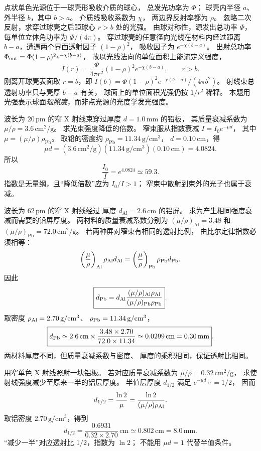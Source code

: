 点状单色光源位于一球壳形吸收介质的球心，
总发光功率为 $\Phi$；
球壳内半径 $a$、外半径 $b$，其中 $b>a$。
介质线吸收系数为 $\chi$，
两边界反射率都为 $\rho$。
忽略二次反射，求穿过球壳之后距球心 $r>b$
处的光强。
\exsolution
由球对称性，源发出总功率 $\Phi$，
每单位立体角功率为 $\Phi/(4\pi)$。
穿过球壳的任意径向光线在材料内经过距离
$b-a$，遭遇两个界面透射因子 $(1-\rho)^2$，
吸收因子为 $e^{-\chi(b-a)}$。
出射总功率
$\Phi_{\rm out}=\Phi(1-\rho)^2e^{-\chi(b-a)}$，
故以光线法向的单位面积上能流定义强度，
\[
 \boxed{I(r)=\frac{\Phi}{4\pi r^2}
 (1-\rho)^2e^{-\chi(b-a)}},\qquad r>b.
\]
刚离开球壳表面取 $r=b$，即
$\boxed{I(b)=\Phi(1-\rho)^2e^{-\chi(b-a)}/(4\pi b^2)}$。
\excheck 射线束总透射功率只与壳厚 $b-a$ 有关，
球面上的单位面积光强仍按 $1/r^2$ 稀释。
本题用光强表示球面\emph{辐照度}，而非点光源的光度学发光强度。

波长为 $20\,\mathrm{pm}$ 的窄 X 射线束穿过厚度
$d=1.0\,\mathrm{mm}$ 的铅板，
其质量衰减系数为
$\mu/\rho=3.6\,\mathrm{cm^2/g}$。
求光束强度降低的倍数。
\exsolution
窄束服从指数衰减
$I=I_0e^{-\mu d}$，
其中 $\mu=(\mu/\rho)\rho_{\mathrm{Pb}}$。
取铅的密度约
$\rho_{\mathrm{Pb}}=11.34\,\mathrm{g/cm^3}$，
$d=0.10\,\mathrm{cm}$，得
\[
 \mu d=
 (3.6\,\mathrm{cm^2/g})
 (11.34\,\mathrm{g/cm^3})
 (0.10\,\mathrm{cm})
 =4.0824.
\]
所以
\[
 \boxed{\frac{I_0}{I}=e^{4.0824}\simeq59.3}.
\]
\excheck 指数是无量纲，且“降低倍数”应为 $I_0/I>1$；
窄束中散射到束外的光子也属于衰减。

波长为 $62\,\mathrm{pm}$ 的窄 X 射线经过
厚度 $d_{\mathrm{Al}}=2.6\,\mathrm{cm}$ 的铝屏。
求为产生相同强度衰减而需要的铅屏厚度。
两材料的质量衰减系数分别为
$(\mu/\rho)_{\mathrm{Al}}=3.48$ 和
$(\mu/\rho)_{\mathrm{Pb}}=72.0\,\mathrm{cm^2/g}$。
\exsolution
若两种屏对窄束有相同的透射比例，
由比尔定律指数必须相等：
\[
 \left(\frac{\mu}{\rho}\right)_{\rm Al}
 \rho_{\rm Al}d_{\rm Al}
 =
 \left(\frac{\mu}{\rho}\right)_{\rm Pb}
 \rho_{\rm Pb}d_{\rm Pb}.
\]
因此
\[
 \boxed{d_{\rm Pb}=d_{\rm Al}
 \frac{(\mu/\rho)_{\rm Al}\rho_{\rm Al}}
 {(\mu/\rho)_{\rm Pb}\rho_{\rm Pb}}}.
\]
取密度
$\rho_{\rm Al}=2.70\,\mathrm{g/cm^3}$、
$\rho_{\rm Pb}=11.34\,\mathrm{g/cm^3}$，
\[
 \boxed{d_{\rm Pb}\simeq
 2.6\,\mathrm{cm}\times
 \frac{3.48\times2.70}{72.0\times11.34}
 \simeq0.0299\,\mathrm{cm}=0.30\,\mathrm{mm}}.
\]
\excheck 两材料厚度不同，但质量衰减系数与密度、
厚度的乘积相同，保证透射比相同。

用窄单色 X 射线照射一块铝板。
若对应质量衰减系数为
$\mu/\rho=0.32\,\mathrm{cm^2/g}$，
求使射线强度减少至原来一半的铝层厚度。
\exsolution
半值层厚度 $d_{1/2}$ 满足
$e^{-\mu d_{1/2}}=1/2$，
因而
\[
 d_{1/2}=\frac{\ln2}{\mu}
 =\frac{\ln2}{(\mu/\rho)\rho_{\rm Al}}.
\]
取铝密度
$2.70\,\mathrm{g/cm^3}$，得到
\[
 \boxed{d_{1/2}=
 \frac{0.6931}{0.32\times2.70}\,\mathrm{cm}
 \simeq0.802\,\mathrm{cm}=8.0\,\mathrm{mm}}.
\]
\excheck “减少一半”对应透射比 $1/2$，指数为 $\ln2$；
不能用 $\mu d=1$ 代替半值条件。

